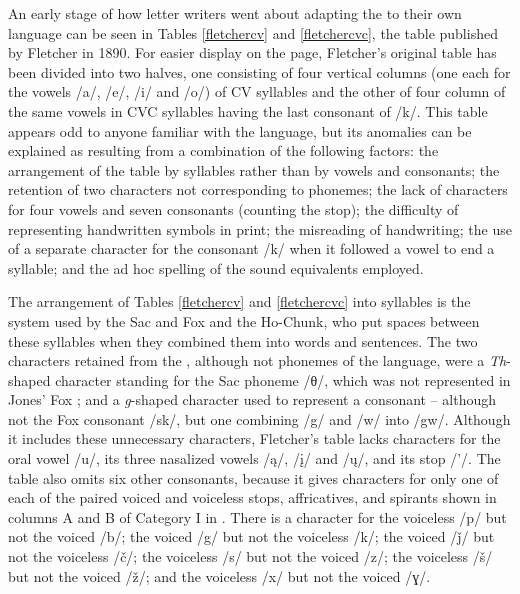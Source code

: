 \documentclass[output=paper]{LSP/langsci}
\begin{document}
An early stage of how  letter writers went about adapting the   to their own language can be seen in Tables \ref{fletchercv} and \ref{fletchercvc}, the   table published by Fletcher in 1890. For easier display on the page, Fletcher's original table has been divided into two halves, one consisting of four vertical columns (one each for the vowels /a/, /e/, /i/ and /o/) of CV syllables and the other of four column of the same vowels in CVC syllables having the last consonant of /k/. This table appears odd to anyone familiar with the  language, but its anomalies can be explained as resulting from a combination of the following factors: the arrangement of the table by syllables rather than by vowels and consonants; the retention of two   characters not corresponding to  phonemes; the lack of  characters for four  vowels and seven  consonants (counting the  stop); the difficulty of  representing handwritten symbols in print; the misreading of handwriting; the use of a separate character for the consonant /k/ when it followed a vowel to end a syllable; and the ad hoc spelling of the  sound equivalents employed.

The arrangement of Tables \ref{fletchercv} and \ref{fletchercvc} into syllables is the system used by the Sac and Fox and the Ho-Chunk, who put spaces between these syllables when they combined them into words and sentences. The two characters retained from the  , although not phonemes of the  language, were a \emph{Th}-shaped  character standing for the Sac phoneme /θ/, which was not represented in Jones' Fox ; and a \emph{g}-shaped character used to represent a consonant  -- although not the Fox consonant  /sk/, but one combining /g/ and /w/ into /gw/. Although it includes these unnecessary characters, Fletcher's table lacks characters for the  oral vowel /u/, its three nasalized vowels /\k{a}/, /\k{i}/ and /\k{u}/, and its  stop /'/. The table also omits six other  consonants, because it gives  characters for only one of each of the paired voiced and voiceless stops, affricatives, and spirants shown in columns A and B of Category I in . There is a character for the voiceless /p/ but not the voiced /b/; the voiced /g/ but not the voiceless /k/; the voiced /ǰ/ but not the voiceless /\v{c}/; the voiceless /s/ but not the voiced /z/; the voiceless /\v{s}/ but not the voiced /\v{z}/; and the voiceless /x/ but not the voiced /ɣ/. 
\end{document}
